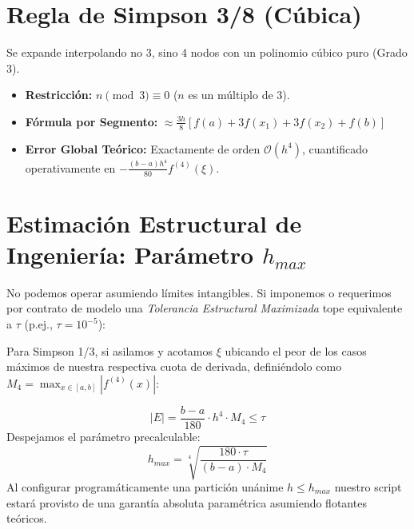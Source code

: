 \documentclass[12pt,a4paper]{article}
\begin{document}
\section{Regla de Simpson 3/8 (Cúbica)}
Se expande interpolando no 3, sino 4 nodos con un polinomio cúbico puro (Grado 3).
\begin{itemize}
    \item \textbf{Restricción:} $n \pmod 3 \equiv 0$ ($n$ es un múltiplo de $3$).
    \item \textbf{Fórmula por Segmento:} $\approx \frac{3h}{8} \left[ f(a) + 3f(x_1) + 3f(x_2) + f(b) \right]$
    \item \textbf{Error Global Teórico:} Exactamente de orden $\mathcal{O}(h^4)$, cuantificado operativamente en $-\frac{(b-a)h^4}{80} f^{(4)}(\xi)$.
\end{itemize}

\section{Estimación Estructural de Ingeniería: Parámetro $h_{max}$}
No podemos operar asumiendo límites intangibles. Si imponemos o requerimos por contrato de modelo una \textit{Tolerancia Estructural Maximizada} tope equivalente a $\tau$ (p.ej., $\tau = 10^{-5}$):

Para Simpson 1/3, si asilamos y acotamos $\xi$ ubicando el peor de los casos máximos de nuestra respectiva cuota de derivada, definiéndolo como $M_4 = \max_{x \in [a,b]} |f^{(4)}(x)|$:

\begin{equation}
    |E| = \frac{b-a}{180} \cdot h^4 \cdot M_4 \leq \tau
\end{equation}
Despejamos el parámetro precalculable:
\begin{equation}
    h_{max} = \sqrt[4]{\frac{180 \cdot \tau}{(b-a) \cdot M_4}}
\end{equation}
Al configurar programáticamente una partición unánime $h \leq h_{max}$ nuestro script estará provisto de una garantía absoluta paramétrica asumiendo flotantes teóricos.
\end{document}
